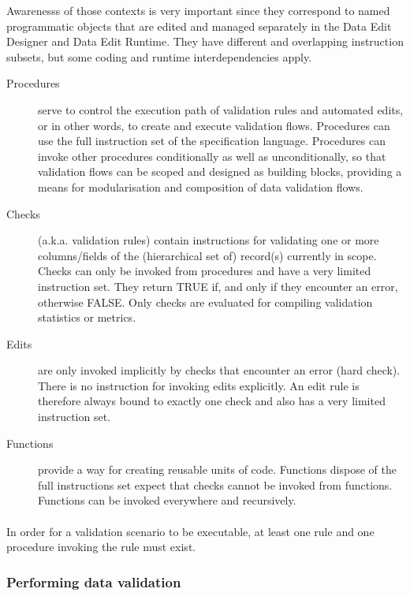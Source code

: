 Awarenesss of those contexts is very important since they correspond to named programmatic objects that are edited and managed separately in the Data Edit Designer and Data Edit Runtime. They have different and overlapping instruction subsets, but some coding and runtime interdependencies apply.

\begin{description}

\item[Procedures] serve to control the execution path of validation rules and automated edits, or in other words, to create and execute validation flows. Procedures can use the full instruction set of the specification language. Procedures can invoke other procedures conditionally as well as unconditionally, so that validation flows can be scoped and designed as building blocks, providing a means for modularisation and composition of data validation flows.

\item[Checks](a.k.a. validation rules) contain instructions for validating one or more columns/fields of the (hierarchical set of) record(s) currently in scope. Checks can only be invoked from procedures and have a very limited instruction set. They return TRUE if, and only if they encounter an error, otherwise FALSE. Only checks are evaluated for compiling validation statistics or metrics.

\item[Edits] are only invoked implicitly by checks that encounter an error (hard check). There is no instruction for invoking edits explicitly. An edit rule is therefore always bound to exactly one check and also has a very limited instruction set.

\item[Functions] provide a way for creating reusable units of code. Functions dispose of the full instructions set expect that checks cannot be invoked from functions. Functions can be invoked everywhere and recursively.

\end{description}

\paragraph{}
In order for a validation scenario to be executable, at least one rule and one procedure invoking the rule must exist.

\subsubsection{Performing data validation}


